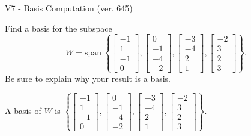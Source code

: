 \begin{exercise}
  \begin{exerciseTitle}V7 - Basis Computation (ver. 645)\end{exerciseTitle}
  \begin{exerciseStatement}
    Find a basis for the subspace 
\[W=\mathrm{span}\ \left\{\left[\begin{array}{r}
-1 \\
1 \\
-1 \\
0
\end{array}\right] , \left[\begin{array}{r}
0 \\
-1 \\
-4 \\
-2
\end{array}\right] , \left[\begin{array}{r}
-3 \\
-4 \\
2 \\
1
\end{array}\right] , \left[\begin{array}{r}
-2 \\
3 \\
2 \\
3
\end{array}\right]\right\}.\]
 Be sure to explain why your result is a basis.


  \end{exerciseStatement}
  \begin{exerciseAnswer}
   A basis of \(W\) is  \(\left\{\left[\begin{array}{r}
-1 \\
1 \\
-1 \\
0
\end{array}\right] , \left[\begin{array}{r}
0 \\
-1 \\
-4 \\
-2
\end{array}\right] , \left[\begin{array}{r}
-3 \\
-4 \\
2 \\
1
\end{array}\right] , \left[\begin{array}{r}
-2 \\
3 \\
2 \\
3
\end{array}\right]\right\}\).
  


  \end{exerciseAnswer}
\end{exercise}